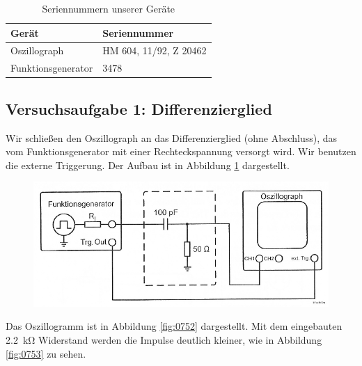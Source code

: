 \begin{table}[hb]
	\center
	\begin{tabular}{ll}
		Gerät & Seriennummer \\
		\hline
		Oszillograph & HM 604, 11/92, Z 20462 \\
		Funktionsgenerator & 3478 \\
	\end{tabular}
	\caption{Seriennummern unserer Geräte}
	\label{tb:seriennummern}
\end{table}

\FloatBarrier
\subsection{Versuchsaufgabe 1: Differenzierglied}

Wir schließen den Oszillograph an das Differenzierglied (ohne Abschluss), das
vom Funktionsgenerator mit einer Rechteckspannung versorgt wird. Wir benutzen
die externe Triggerung. Der Aufbau ist in Abbildung \ref{fig:1-6} dargestellt.

\begin{figure}[htbp]
	\centering
	\includegraphics[width=\textwidth]{Schaltplan/1-6.png}
	\caption{%
		\cite[Abbildung~1.6]{physik313-Anleitung}
	}
	\label{fig:1-6}
\end{figure}

Das
Oszillogramm ist in Abbildung \ref{fig:0752} dargestellt. Mit dem eingebauten
\SI{2.2}{\kilo\ohm} Widerstand werden die Impulse deutlich kleiner, wie in
Abbildung \ref{fig:0753} zu sehen.

